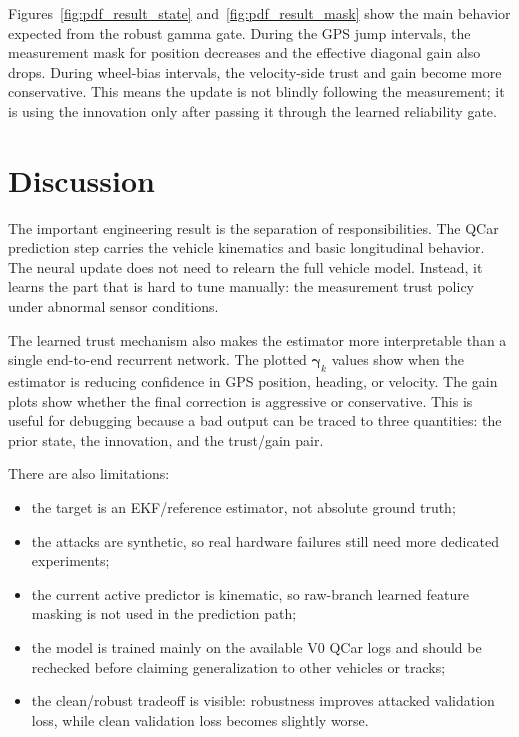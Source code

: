 \documentclass[11pt,a4paper]{article}
\newcommand{\trust}{\bm{\gamma}}
\begin{document}
Figures~\ref{fig:pdf_result_state} and~\ref{fig:pdf_result_mask} show the main
behavior expected from the robust gamma gate. During the GPS jump intervals,
the measurement mask for position decreases and the effective diagonal gain
also drops. During wheel-bias intervals, the velocity-side trust and gain become
more conservative. This means the update is not blindly following the
measurement; it is using the innovation only after passing it through the
learned reliability gate.

\section{Discussion}

The important engineering result is the separation of responsibilities.
The QCar prediction step carries the vehicle kinematics and basic longitudinal
behavior. The neural update does not need to relearn the full vehicle model.
Instead, it learns the part that is hard to tune manually: the measurement
trust policy under abnormal sensor conditions.

The learned trust mechanism also makes the estimator more interpretable than a
single end-to-end recurrent network. The plotted $\trust_k$ values show when
the estimator is reducing confidence in GPS position, heading, or velocity.
The gain plots show whether the final correction is aggressive or conservative.
This is useful for debugging because a bad output can be traced to three
quantities: the prior state, the innovation, and the trust/gain pair.

There are also limitations:
\begin{itemize}
  \item the target is an EKF/reference estimator, not absolute ground truth;
  \item the attacks are synthetic, so real hardware failures still need more
  dedicated experiments;
  \item the current active predictor is kinematic, so raw-branch learned
  feature masking is not used in the prediction path;
  \item the model is trained mainly on the available V0 QCar logs and should be
  rechecked before claiming generalization to other vehicles or tracks;
  \item the clean/robust tradeoff is visible: robustness improves attacked
  validation loss, while clean validation loss becomes slightly worse.
\end{itemize}
\end{document}
